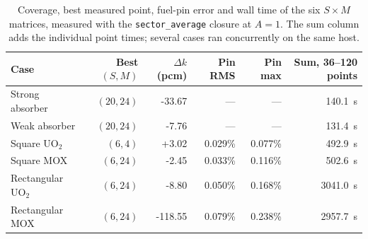 \begin{table}[htbp]
\centering
\caption{Coverage, best measured point, fuel-pin error and wall time of the six $S\times M$ matrices, measured with the \texttt{sector\_average} closure at $A=1$. The sum column adds the individual point times; several cases ran concurrently on the same host.}
\label{tab:study4-assembly}
\centering\small
\begin{tabular}{l r r r r r}
\hline
Case & Best $(S,M)$ & $\Delta k$ (pcm) & Pin RMS & Pin max & Sum, 36--120 points\\
\hline
Strong absorber & $(20,24)$ & -33.67 & --- & --- & 140.1~s\\
Weak absorber & $(20,24)$ & -7.76 & --- & --- & 131.4~s\\
Square UO$_2$ & $(6,4)$ & +3.02 & 0.029\% & 0.077\% & 492.9~s\\
Square MOX & $(6,24)$ & -2.45 & 0.033\% & 0.116\% & 502.6~s\\
Rectangular UO$_2$ & $(6,24)$ & -8.80 & 0.050\% & 0.168\% & 3041.0~s\\
Rectangular MOX & $(6,24)$ & -118.55 & 0.079\% & 0.238\% & 2957.7~s\\
\hline
\end{tabular}
\end{table}
